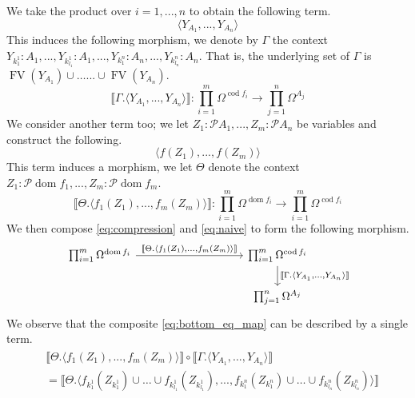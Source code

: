\documentclass{tac}
\newcommand{\call}[1]{\mathcal{#1}}
\newcommand{\lto}{\longrightarrow}
\begin{document}
	We take the product over $i = 1,...,n$ to obtain the following term.
	\begin{equation}
		\langle Y_{A_1},...,Y_{A_n}\rangle
	\end{equation}
	This induces the following morphism, we denote by $\Gamma$ the context $Y_{k_1^1}:A_1,...,Y_{k_{l_1}^1}:A_1,...,Y_{k_1^n}:A_n,...,Y_{k_{l_n}^n}:A_n$. That is, the underlying set of $\Gamma$ is $\operatorname{FV}(Y_{A_1}) \cup \hdots ... \cup \operatorname{FV}(Y_{A_n})$.
	\begin{equation}
		\llbracket \Gamma. \langle Y_{A_1},...,Y_{A_n}\rangle\rrbracket:  \prod_{i = 1}^m \Omega^{\operatorname{cod}f_i} \lto \prod_{j = 1}^n \Omega^{A_j}
	\end{equation}
	We consider another term too; we let $Z_1:\call{P}A_1,...,Z_{m}:\call{P}A_n$ be variables and construct the following.
	\begin{equation}
		\langle f(Z_1),...,f(Z_m)\rangle
	\end{equation}
	This term induces a morphism, we let $\Theta$ denote the context $Z_1:\call{P}\operatorname{dom}f_1,...,Z_{m}:\call{P}\operatorname{dom}f_m$.
	\begin{equation}\label{eq:naive}
		\llbracket \Theta. \langle f_1(Z_1),...,f_m(Z_m)\rangle \rrbracket: \prod_{i = 1}^m \Omega^{\operatorname{dom}f_i} \lto \prod_{i = 1}^m \Omega^{\operatorname{cod}f_i}
	\end{equation}
	We then compose \eqref{eq:compression} and \eqref{eq:naive} to form the following morphism.
	\begin{equation}\label{eq:bottom_eq_map}
		\begin{tikzcd}[column sep = huge]
			\prod_{i = 1}^m \Omega^{\operatorname{dom}f_i}\arrow[rr,"{\llbracket \Theta. \langle f_1(Z_1),...,f_m(Z_m)\rangle\rrbracket}"] && \prod_{i = 1}^m \Omega^{\operatorname{cod}f_i}\arrow[d,"{\llbracket \Gamma. \langle Y_{A_1},...,Y_{A_n}\rangle\rrbracket}"]\\
			&& \prod_{j = 1}^n \Omega^{A_j}
		\end{tikzcd}
	\end{equation}
	We observe that the composite \eqref{eq:bottom_eq_map} can be described by a single term.
	\begin{align}
		\begin{split}
			&\llbracket \Theta. \langle f_1(Z_1),...,f_m(Z_m)\rangle \rrbracket \circ \llbracket \Gamma . \langle Y_{A_1},...,Y_{A_n}\rangle \rrbracket \\
		&= \llbracket \Theta. \langle f_{k_1^1}(Z_{k_1^1}) \cup \hdots \cup f_{k_{l_1}^1}(Z_{k_{l_1}^1}),...,f_{k_1^n}(Z_{k_1^n}) \cup \hdots \cup f_{k_{l_n}^n}(Z_{k_{l_n}^n})\rangle \rrbracket
		\end{split}
	\end{align}
\end{document}
